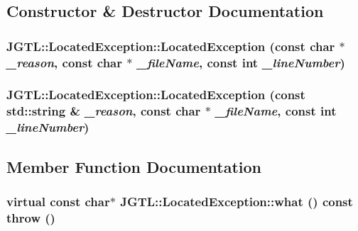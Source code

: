 \subsection{Constructor \& Destructor Documentation}
\hypertarget{class_j_g_t_l_1_1_located_exception_6dc12a4d8a6e75095fd87a45c2cfc54e}{
\subsubsection[LocatedException]{\setlength{\rightskip}{0pt plus 5cm}JGTL::Located\-Exception::Located\-Exception (const char $\ast$ {\em \_\-reason}, const char $\ast$ {\em \_\-file\-Name}, const int {\em \_\-line\-Number})}}
\label{class_j_g_t_l_1_1_located_exception_6dc12a4d8a6e75095fd87a45c2cfc54e}


\hypertarget{class_j_g_t_l_1_1_located_exception_3204e4c6770b4f61dc063aa0e440dd9a}{
\subsubsection[LocatedException]{\setlength{\rightskip}{0pt plus 5cm}JGTL::Located\-Exception::Located\-Exception (const std::string \& {\em \_\-reason}, const char $\ast$ {\em \_\-file\-Name}, const int {\em \_\-line\-Number})}}
\label{class_j_g_t_l_1_1_located_exception_3204e4c6770b4f61dc063aa0e440dd9a}




\subsection{Member Function Documentation}
\hypertarget{class_j_g_t_l_1_1_located_exception_563583a831452b2e4a522ba943f8b6ed}{
\subsubsection[what]{\setlength{\rightskip}{0pt plus 5cm}virtual const char$\ast$ JGTL::Located\-Exception::what () const  throw ()}}
\label{class_j_g_t_l_1_1_located_exception_563583a831452b2e4a522ba943f8b6ed}




